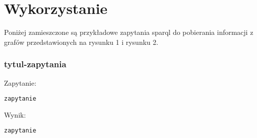 \section{Wykorzystanie}
\label{cha:impl}

Poniżej zamieszczone są przykładowe zapytania sparql do pobierania informacji z grafów przedstawionych na rysunku 1 i rysunku 2.

\subsubsection{tytul-zapytania}

Zapytanie:
\begin{lstlisting}
zapytanie
\end{lstlisting}

Wynik:
\begin{lstlisting}
zapytanie
\end{lstlisting}

